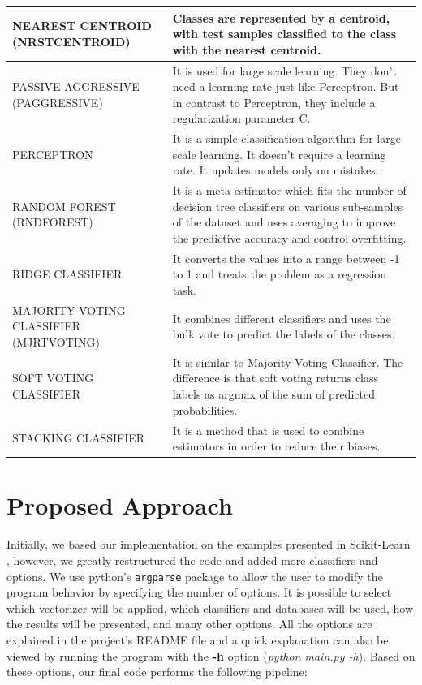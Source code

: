 \documentclass[conference]{IEEEtran}
\begin{document}
\begin{table}[!b]
\begin{tabular}{| m{2cm} | m{6cm} |}
    \hline
    NEAREST CENTROID
    (NRSTCENTROID)& Classes are represented by a centroid, with test samples classified to the class with the nearest centroid. \\
    \hline
    PASSIVE AGGRESSIVE
    (PAGGRESSIVE)& It is used for large scale learning. They don't need a learning rate just like Perceptron. But in contrast to Perceptron, they include a regularization parameter C. \\
    \hline
    PERCEPTRON & It is a simple classification algorithm for large scale learning. It doesn't require a learning rate. It updates models only on mistakes. \\
    \hline
    RANDOM FOREST
    (RNDFOREST)
    & It is a meta estimator which fits the number of decision tree classifiers on various sub-samples of the dataset and uses averaging to improve the predictive accuracy and control overfitting. \\
    \hline
    RIDGE CLASSIFIER & It converts the values into a range between -1 to 1 and treats the problem as a regression task. \\
    \hline
    MAJORITY VOTING CLASSIFIER
    (MJRTVOTING)& It combines different classifiers and uses the bulk vote to predict the labels of the classes.\\
    \hline
    SOFT VOTING CLASSIFIER & It is similar to Majority Voting Classifier. The difference is that soft voting returns class labels as argmax of the sum of predicted probabilities.\\
    \hline
    STACKING CLASSIFIER & 
    It is a method that is used to combine estimators in order to reduce their biases.\\
    \hline
  \end{tabular}
\end{table}

\section{Proposed Approach}
\label{section:proposed_approach}

Initially, we based our implementation on the examples presented in Scikit-Learn \cite{scikit-learn}, however, we greatly restructured the code and added more classifiers and options. We use python's \texttt{argparse} package to allow the user to modify the program behavior by specifying the number of options. It is possible to select which vectorizer will be applied, which classifiers and databases will be used, how the results will be presented, and many other options. All the options are explained in the project's README file and a quick explanation can also be viewed by running the program with the \textbf{-h} option (\textit{python main.py -h}). Based on these options, our final code performs the following pipeline:
\end{document}
